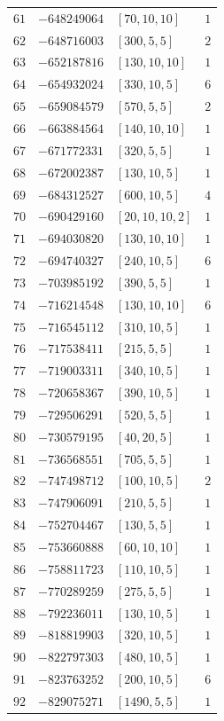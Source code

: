 \documentclass[11pt]{article}
\begin{document}
\begin{center}
\begin{longtable}{r r l c}
$61$ & $-648249064$ & $[70,10,10]$ & $1$\\
$62$ & $-648716003$ & $[300,5,5]$ & $2$\\
$63$ & $-652187816$ & $[130,10,10]$ & $1$\\
$64$ & $-654932024$ & $[330,10,5]$ & $6$\\
$65$ & $-659084579$ & $[570,5,5]$ & $2$\\
$66$ & $-663884564$ & $[140,10,10]$ & $1$\\
$67$ & $-671772331$ & $[320,5,5]$ & $1$\\
$68$ & $-672002387$ & $[130,10,5]$ & $1$\\
$69$ & $-684312527$ & $[600,10,5]$ & $4$\\
$70$ & $-690429160$ & $[20,10,10,2]$ & $1$\\
$71$ & $-694030820$ & $[130,10,10]$ & $1$\\
$72$ & $-694740327$ & $[240,10,5]$ & $6$\\
$73$ & $-703985192$ & $[390,5,5]$ & $1$\\
$74$ & $-716214548$ & $[130,10,10]$ & $6$\\
$75$ & $-716545112$ & $[310,10,5]$ & $1$\\
$76$ & $-717538411$ & $[215,5,5]$ & $1$\\
$77$ & $-719003311$ & $[340,10,5]$ & $1$\\
$78$ & $-720658367$ & $[390,10,5]$ & $1$\\
$79$ & $-729506291$ & $[520,5,5]$ & $1$\\
$80$ & $-730579195$ & $[40,20,5]$ & $1$\\
$81$ & $-736568551$ & $[705,5,5]$ & $1$\\
$82$ & $-747498712$ & $[100,10,5]$ & $2$\\
$83$ & $-747906091$ & $[210,5,5]$ & $1$\\
$84$ & $-752704467$ & $[130,5,5]$ & $1$\\
$85$ & $-753660888$ & $[60,10,10]$ & $1$\\
$86$ & $-758811723$ & $[110,10,5]$ & $1$\\
$87$ & $-770289259$ & $[275,5,5]$ & $1$\\
$88$ & $-792236011$ & $[130,10,5]$ & $1$\\
$89$ & $-818819903$ & $[320,10,5]$ & $1$\\
$90$ & $-822797303$ & $[480,10,5]$ & $1$\\
$91$ & $-823763252$ & $[200,10,5]$ & $6$\\
$92$ & $-829075271$ & $[1490,5,5]$ & $1$\\

\end{longtable}
\end{center}
\end{document}

